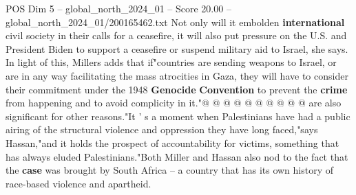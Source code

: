 \begin{textsample}{POS Dim 5 – global\_north\_2024\_01 – Score 20.00 – global\_north\_2024\_01/200165462.txt}
Not only will it embolden \textbf{international} civil society in their calls for a ceasefire, it will also put pressure on the U.S. and President Biden to support a ceasefire or suspend military aid to Israel, she says.
In light of this, Millers adds that if"countries are sending weapons to Israel, or are in any way facilitating the mass atrocities in Gaza, they will have to consider their commitment under the 1948 \textbf{Genocide} \textbf{Convention} to prevent the \textbf{crime} from happening and to avoid complicity in it."@ @ @ @ @ @ @ @ @ @ are also significant for other reasons."It ' s a moment when Palestinians have had a public airing of the structural violence and oppression they have long faced,"says Hassan,"and it holds the prospect of accountability for victims, something that has always eluded Palestinians."Both Miller and Hassan also nod to the fact that the \textbf{case} was brought by South Africa -- a country that has its own history of race-based violence and apartheid.

\end{textsample}
